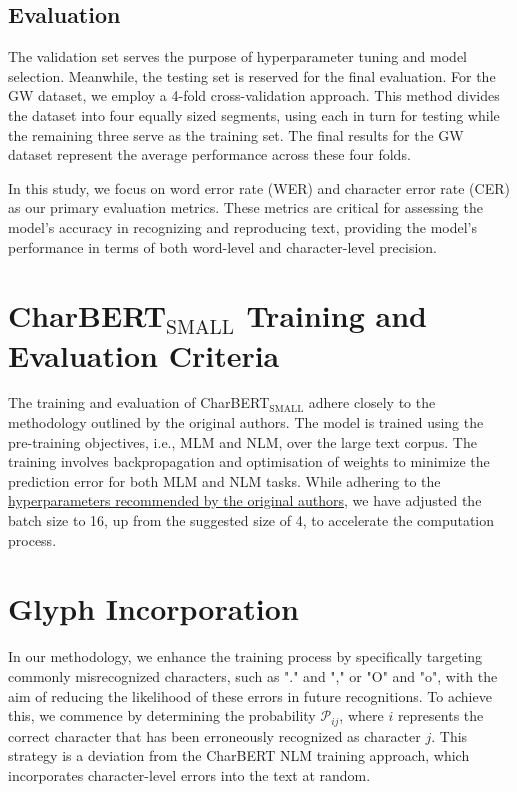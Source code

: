\subsection{Evaluation}
\label{subsec:3_evaluation}
The validation set serves the purpose of hyperparameter tuning and model selection. Meanwhile, the testing set is reserved for the final evaluation. For the GW dataset, we employ a 4-fold cross-validation approach. This method divides the dataset into four equally sized segments, using each in turn for testing while the remaining three serve as the training set. The final results for the GW dataset represent the average performance across these four folds.

In this study, we focus on word error rate (WER) and character error rate (CER) as our primary evaluation metrics. These metrics are critical for assessing the model's accuracy in recognizing and reproducing text, providing the model's performance in terms of both word-level and character-level precision.
\section{CharBERT$_{\text{SMALL}}$ Training and Evaluation Criteria}
\label{sec:3_charbert_training_and_evaluation_criteria}
The training and evaluation of CharBERT$_{\text{SMALL}}$ adhere closely to the methodology outlined by the original authors. The model is trained using the pre-training objectives, i.e., MLM and NLM, over the large text corpus. The training involves backpropagation and optimisation of weights to minimize the prediction error for both MLM and NLM tasks. While adhering to the \href{https://github.com/mawentao277/CharBERT/blob/main/shell/mlm.sh}{hyperparameters recommended by the original authors}, we have adjusted the batch size to 16, up from the suggested size of 4, to accelerate the computation process.

\section{Glyph Incorporation}
\label{sec:3_glyph_incorporation}
In our methodology, we enhance the training process by specifically targeting commonly misrecognized characters, such as "." and "," or "O" and "o", with the aim of reducing the likelihood of these errors in future recognitions. To achieve this, we commence by determining the probability $\mathcal{P}_{ij}$, where $i$ represents the correct character that has been erroneously recognized as character $j$. This strategy is a deviation from the CharBERT NLM training approach, which incorporates character-level errors into the text at random.

